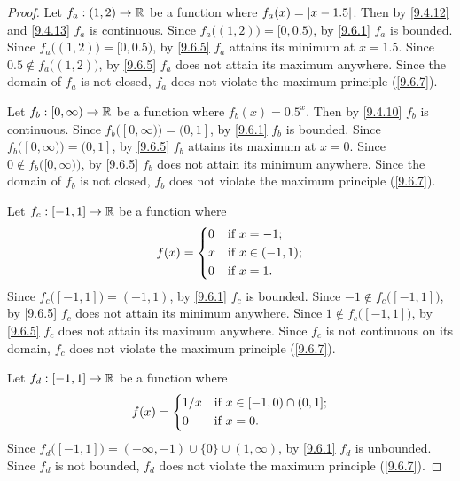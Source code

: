 \begin{proof}
  Let \(f_a : (1, 2) \to \mathbb{R}\) be a function where \(f_a(x) = \left\lvert x - 1.5\right\rvert\).
  Then by \cref{9.4.12} and \cref{9.4.13} \(f_a\) is continuous.
  Since \(f_a\big((1, 2)\big) = [0, 0.5)\), by \cref{9.6.1} \(f_a\) is bounded.
  Since \(f_a\big((1, 2)\big) = [0, 0.5)\), by \cref{9.6.5} \(f_a\) attains its minimum at \(x = 1.5\).
  Since \(0.5 \notin f_a\big((1, 2)\big)\), by \cref{9.6.5} \(f_a\) does not attain its maximum anywhere.
  Since the domain of \(f_a\) is not closed, \(f_a\) does not violate the maximum principle (\cref{9.6.7}).

  Let \(f_b : [0, \infty) \to \mathbb{R}\) be a function where \(f_b(x) = 0.5^x\).
  Then by \cref{9.4.10} \(f_b\) is continuous.
  Since \(f_b\big([0, \infty)\big) = (0, 1]\), by \cref{9.6.1} \(f_b\) is bounded.
  Since \(f_b\big([0, \infty)\big) = (0, 1]\), by \cref{9.6.5} \(f_b\) attains its maximum at \(x = 0\).
  Since \(0 \notin f_b\big([0, \infty)\big)\), by \cref{9.6.5} \(f_b\) does not attain its minimum anywhere.
  Since the domain of \(f_b\) is not closed, \(f_b\) does not violate the maximum principle (\cref{9.6.7}).

  Let \(f_c : [-1, 1] \to \mathbb{R}\) be a function where
  \[
    f(x) = \begin{dcases}
      0 & \text{if } x = -1;        \\
      x & \text{if } x \in (-1, 1); \\
      0 & \text{if } x = 1.
    \end{dcases}
  \]
  Since \(f_c\big([-1, 1]\big) = (-1, 1)\), by \cref{9.6.1} \(f_c\) is bounded.
  Since \(-1 \notin f_c\big([-1, 1]\big)\), by \cref{9.6.5} \(f_c\) does not attain its minimum anywhere.
  Since \(1 \notin f_c\big([-1, 1]\big)\), by \cref{9.6.5} \(f_c\) does not attain its maximum anywhere.
  Since \(f_c\) is not continuous on its domain, \(f_c\) does not violate the maximum principle (\cref{9.6.7}).

  Let \(f_d : [-1, 1] \to \mathbb{R}\) be a function where
  \[
    f(x) = \begin{dcases}
      1 / x & \text{if } x \in [-1, 0) \cap (0, 1]; \\
      0     & \text{if } x = 0.
    \end{dcases}
  \]
  Since \(f_d\big([-1, 1]\big) = (-\infty, -1) \cup \{0\} \cup (1, \infty)\), by \cref{9.6.1} \(f_d\) is unbounded.
  Since \(f_d\) is not bounded, \(f_d\) does not violate the maximum principle (\cref{9.6.7}).
\end{proof}

